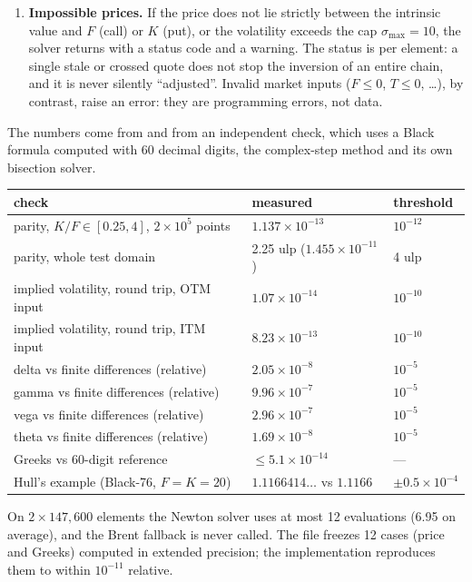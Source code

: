 \begin{enumerate}
$\sigma=0$, without flagging it. The fix: the root is accepted only if $s>0$ and
$\Phi(d_2)\ge10^3\cdot\text{(smallest normal number)}\approx{2.2\times10^{-305}}$; otherwise the result is 
with a dedicated status and a warning. No quoted price lies in that region, but the rule ``never a wrong number
silently'' applies everywhere.
\item \textbf{Impossible prices.} If the price does not lie strictly between the intrinsic value and $F$ (call) or
$K$ (put), or the volatility exceeds the cap $\sigma_{\max}=10$, the solver returns  with a status code and a
warning. The status is per element: a single stale or crossed quote does not stop the inversion of an entire chain,
and it is never silently ``adjusted''. Invalid market inputs ($F\le0$, $T\le0$, \dots), by contrast, raise an error:
they are programming errors, not data.
\end{enumerate}

\begin{progetto}[title={In the qpricer project: Phase 1 results}]
The numbers come from  and from an independent check, which uses a Black formula
computed with 60 decimal digits, the complex-step method and its own bisection solver.
\begin{center}
\small
\begin{tabularx}{\textwidth}{X l l}
\toprule
check & measured & threshold\\
\midrule
parity, $K/F\in[0.25,4]$, ${2\times10^5}$ points & ${1.137\times10^{-13}}$ & $10^{-12}$\\
parity, whole test domain & 2.25 ulp (${1.455\times10^{-11}}$) & 4 ulp\\
implied volatility, round trip, OTM input & ${1.07\times10^{-14}}$ & $10^{-10}$\\
implied volatility, round trip, ITM input & ${8.23\times10^{-13}}$ & $10^{-10}$\\
delta vs finite differences (relative) & ${2.05\times10^{-8}}$ & $10^{-5}$\\
gamma vs finite differences (relative) & ${9.96\times10^{-7}}$ & $10^{-5}$\\
vega vs finite differences (relative) & ${2.96\times10^{-7}}$ & $10^{-5}$\\
theta vs finite differences (relative) & ${1.69\times10^{-8}}$ & $10^{-5}$\\
Greeks vs 60-digit reference & $\le{5.1\times10^{-14}}$ & ---\\
Hull's example (Black-76, $F=K=20$) & $1.1166414\ldots$ vs $1.1166$ & $\pm{0.5\times10^{-4}}$\\
\bottomrule
\end{tabularx}
\end{center}
On $2\times147{,}600$ elements the Newton solver uses at most 12 evaluations (6.95 on average), and the Brent fallback
is never called. The file  freezes 12 cases (price and Greeks) computed in
extended precision; the implementation reproduces them to within $10^{-11}$ relative.
\end{progetto}

